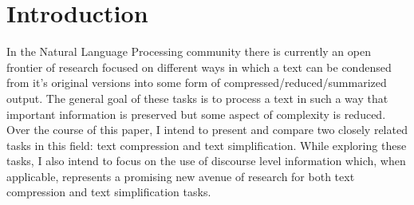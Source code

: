 \section{Introduction}



{In the Natural Language Processing community there is currently an open frontier of research focused on different ways in which a text can be condensed from it's original versions into some form of compressed/reduced/summarized output. The general goal of these tasks is to process a text in such a way that important information is preserved but some aspect of complexity is reduced.  Over the course of this paper, I intend to present and compare two closely related tasks in this field: text compression and  text simplification. While exploring these tasks, I also intend to focus on the use of discourse level information which, when applicable, represents a promising new avenue of research for both text compression and text simplification tasks.}

